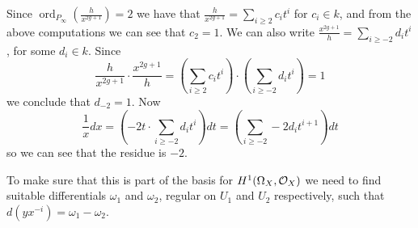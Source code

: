 \documentclass[draft, 11pt]{article} %
\theoremstyle{plain}
\theoremstyle{remark}
\newcommand{\cO}{{\cal O}}
\DeclareMathOperator{\ord}{ord}
\begin{document}
Since $\ord_{P_\infty}\left(\frac{h}{x^{2g+1}}\right) = 2$ we have that $\frac{h}{x^{2g+1}} = \sum_{i\geq 2} c_it^i$ for $c_i\in k$, and from the above computations we can see that $c_2 = 1$.
We can also write $\frac{x^{2g+1}}{h} = \sum_{i\geq -2} d_it^i$, for some $d_i\in k$.
Since \[
\frac{h}{x^{2g+1}} \cdot \frac{x^{2g+1}}{h} = \left( \sum_{i\geq 2} c_it^i\right) \cdot \left( \sum_{i\geq -2} d_it^i\right) = 1
\]
 we conclude that $d_{-2} = 1$. 
Now 
\[
\frac{1}{x}dx = \left( -2t \cdot \sum_{i\geq -2} d_it^i\right) dt = \left( \sum_{i\geq -2}-2d_it^{i+1} \right) dt
\]
so we can see that the residue is $-2$.

To make sure that this is part of the basis for $H^1(\Omega_X,\cO_X)$ we need to find suitable differentials $\omega_1$ and $\omega_2$, regular on $U_1$ and $U_2$ respectively, such that $d(yx^{-i}) = \omega_1 - \omega_2$.
\end{document}

